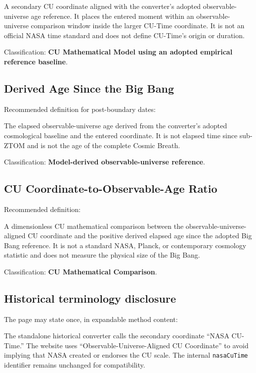 \documentclass[11pt,letterpaper]{article}
\newcommand{\term}[1]{\textbf{\textsf{#1}}}
\begin{document}
\begin{notebox}
A secondary CU coordinate aligned with the converter's adopted observable-
universe age reference. It places the entered moment within an observable-
universe comparison window inside the larger CU-Time coordinate. It is not an
official NASA time standard and does not define CU-Time's origin or duration.
\end{notebox}

Classification: \term{CU Mathematical Model using an adopted empirical
reference baseline}.

\subsection{Derived Age Since the Big Bang}

Recommended definition for post-boundary dates:

\begin{notebox}
The elapsed observable-universe age derived from the converter's adopted
cosmological baseline and the entered coordinate. It is not elapsed time since
sub-ZTOM and is not the age of the complete Cosmic Breath.
\end{notebox}

Classification: \term{Model-derived observable-universe reference}.

\subsection{CU Coordinate-to-Observable-Age Ratio}

Recommended definition:

\begin{notebox}
A dimensionless CU mathematical comparison between the observable-universe-
aligned CU coordinate and the positive derived elapsed age since the adopted
Big Bang reference. It is not a standard NASA, Planck, or contemporary
cosmology statistic and does not measure the physical size of the Big Bang.
\end{notebox}

Classification: \term{CU Mathematical Comparison}.

\subsection{Historical terminology disclosure}

The page may state once, in expandable method content:

\begin{notebox}
The standalone historical converter calls the secondary coordinate ``NASA
CU-Time.'' The website uses ``Observable-Universe-Aligned CU Coordinate'' to
avoid implying that NASA created or endorses the CU scale. The internal
\texttt{nasaCuTime} identifier remains unchanged for compatibility.
\end{notebox}
\end{document}
